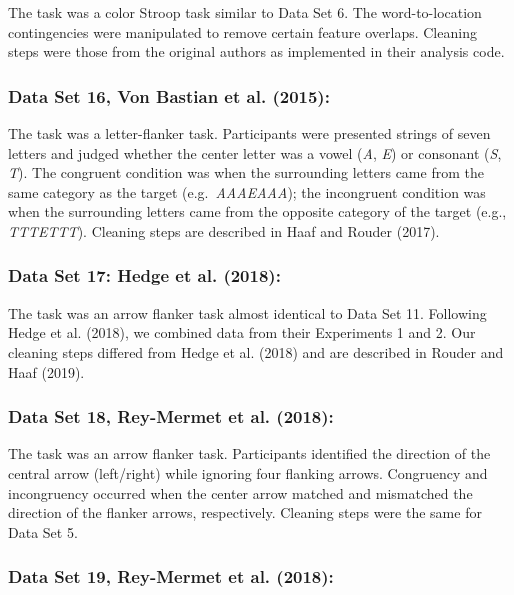 \documentclass[
  ,man]{apa6}
\begin{document}
The task was a color Stroop task similar to Data Set 6. The word-to-location contingencies were manipulated to remove certain feature overlaps. Cleaning steps were those from the original authors as implemented in their analysis code.

\hypertarget{data-set-16-vonbastian.etal.2015}{%
\subsubsection{Data Set 16, Von Bastian et al. (2015):}\label{data-set-16-vonbastian.etal.2015}}

The task was a letter-flanker task. Participants were presented strings of seven letters and judged whether the center letter was a vowel (\emph{A}, \emph{E}) or consonant (\emph{S}, \emph{T}). The congruent condition was when the surrounding letters came from the same category as the target (e.g.~\emph{AAAEAAA}); the incongruent condition was when the surrounding letters came from the opposite category of the target (e.g., \emph{TTTETTT}). Cleaning steps are described in Haaf and Rouder (2017).

\hypertarget{data-set-17-hedge.etal.2018}{%
\subsubsection{Data Set 17: Hedge et al. (2018):}\label{data-set-17-hedge.etal.2018}}

The task was an arrow flanker task almost identical to Data Set 11. Following Hedge et al. (2018), we combined data from their Experiments 1 and 2. Our cleaning steps differed from Hedge et al. (2018) and are described in Rouder and Haaf (2019).

\hypertarget{data-set-18-rey-mermet.etal.2018}{%
\subsubsection{Data Set 18, Rey-Mermet et al. (2018):}\label{data-set-18-rey-mermet.etal.2018}}

The task was an arrow flanker task. Participants identified the direction of the central arrow (left/right) while ignoring four flanking arrows. Congruency and incongruency occurred when the center arrow matched and mismatched the direction of the flanker arrows, respectively. Cleaning steps were the same for Data Set 5.

\hypertarget{data-set-19-rey-mermet.etal.2018}{%
\subsubsection{Data Set 19, Rey-Mermet et al. (2018):}\label{data-set-19-rey-mermet.etal.2018}}
\end{document}
